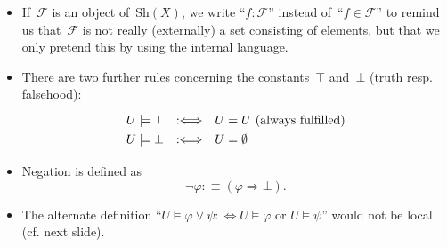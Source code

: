 \documentclass[10pt,utf8,notheorems,compress]{beamer}
\newcommand{\F}{\mathcal{F}}
\newcommand{\Sh}{\mathrm{Sh}}
\newcommand{\?}{\,{:}\,}
\renewcommand{\_}{\mathpunct{.}\,}
\newcommand{\Ll}{:\Longleftrightarrow}
\begin{document}
{{\begin{itemize}
      \item \begin{justify}If~$\F$ is an object of~$\Sh(X)$, we write
      ``$f:\F$'' instead of~``$f\in\F$'' to remind us that~$\F$ is not really
      (externally) a set consisting of elements, but that we only pretend this
      by using the internal language.\end{justify}

      \item There are two further rules concerning the constants~$\top$
      and~$\bot$ (truth resp. falsehood):
        \[ \renewcommand{\arraystretch}{1.3}\begin{array}{@{}lcl@{}}
          U \models \top &\Ll& U = U \text{ (always fulfilled)}\\
          U \models \bot &\Ll& U = \emptyset
        \end{array} \]

      \item Negation is defined as
      \[ \neg\varphi :\equiv (\varphi \Rightarrow \bot). \]

      \item \begin{justify}The alternate definition ``$U \models \varphi \vee \psi :\Leftrightarrow
      \text{$U \models \varphi$ or $U \models \psi$}$'' would not be local (cf.
      next slide).\end{justify}
    \end{itemize}
  }
}
\end{document}
